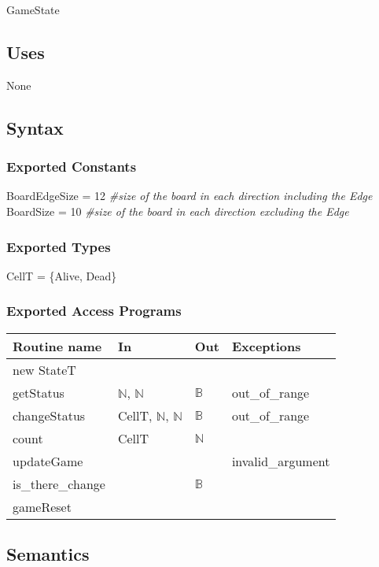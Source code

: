 \documentclass[12pt]{article}
\begin{document}
GameState

\subsection* {Uses}

None

\subsection* {Syntax}

\subsubsection* {Exported Constants}

BoardEdgeSize = 12 \textit{\#size of the board in each direction including the Edge}\\
BoardSize = 10 \textit{\#size of the board in each direction excluding the Edge} 

\subsubsection* {Exported Types}

CellT = \{Alive, Dead\}


\subsubsection* {Exported Access Programs}
\begin{tabular}{| l | l | l | l |}
\hline
\textbf{Routine name} & \textbf{In} & \textbf{Out} & \textbf{Exceptions}\\
\hline
new StateT &  &  &\\
\hline
getStatus & $\mathbb{N}$, $\mathbb{N}$ & $\mathbb{B}$ & out\_of\_range\\
\hline
changeStatus & CellT, $\mathbb{N}$, $\mathbb{N}$ & $\mathbb{B}$ & out\_of\_range\\
\hline
count & CellT & $\mathbb{N}$ & \\
\hline
updateGame & & & invalid\_argument\\
\hline
is\_there\_change	& & $\mathbb{B}$ &\\
\hline
gameReset & & & \\
\hline
\end{tabular}

\subsection* {Semantics}
\end{document}
